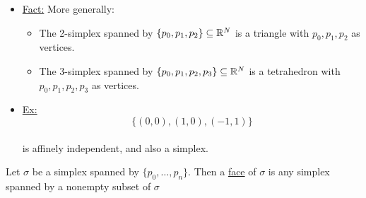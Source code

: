 \documentclass[../notes.tex]{subfiles}
\begin{document}
\begin{itemize}
\begin{center}
\\
        \end{center}
    \item \underline{Fact:} More generally:
        \begin{itemize}
            \item The 2-simplex spanned by $\{p_0,p_1,p_2\}\subseteq\mathbb{R}^N$ is a triangle
                with $p_0,p_1,p_2$ as vertices.
            \item The 3-simplex spanned by $\{p_0,p_1,p_2,p_3\}\subseteq\mathbb{R}^N$ is a 
                tetrahedron with $p_0,p_1,p_2,p_3$ as vertices.
        \end{itemize}
    \item \underline{Ex:}
        \[
            \{(0,0), (1,0), (-1,1)\}
        \]\\
        is affinely independent, and also a simplex.
\end{itemize}
\begin{definition}
    Let $\sigma$ be a simplex spanned by $\{p_0,\dots,p_n\}$. Then a \underline{face}
    of $\sigma$ is any simplex spanned by a nonempty subset of $\sigma$
\end{definition}
\end{document}
